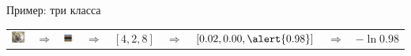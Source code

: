 \documentclass[notes,12pt, aspectratio=169]{beamer}
\begin{document}
\begin{frame}{Пример: три класса}
\begin{tabular}{m{2.5cm} m{0.35cm} m{1.8cm} m{0.35cm} m{1cm} m{0.35cm} m{2.7cm} m{0.5cm} m{1.5cm}}
\includegraphics[scale=0.2]{tab_dog.png}&  {\Large $\Rightarrow$} &  \includegraphics[scale=0.2]{tab_nn.png}  &  {\Large $\Rightarrow$}  &  $[4, 2, 8]$ &  {\Large $\Rightarrow$}  & $[0.02, 0.00, \alert{0.98}]$ & {\Large $\Rightarrow$}  & $-\ln 0.98$\\


\end{tabular}
\end{frame}
\end{document}
